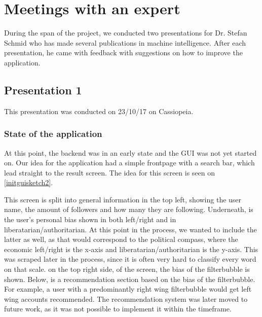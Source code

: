 \section{Meetings with an expert} \label{expMeeting}
During the span of the project, we conducted two presentations for Dr. Stefan
Schmid who has made several publications in machine intelligence. After
each presentation, he came with feedback with suggestions on how to improve the
application. 
\subsection{Presentation 1}
This presentation was conducted on 23/10/17 on Cassiopeia.
\subsubsection{State of the application}
At this point, the backend was in an early state and the \ac{GUI} was not yet
started on. Our idea for the application had a simple frontpage with a search
bar, which lead straight to the result screen. The idea for this screen is seen
on \autoref{initguisketch2}.


This screen is split into general information in the top left, showing the user
name, the amount of followers and how many they are following. Underneath, is
the user's personal bias shown in both left/right and in
liberatarian/authoritarian. At this point in the process, we wanted to include
the latter as well, as that would correspond to the political compass, where the
economic left/right is the x-axis and liberatarian/authoritarian is the y-axis.
This was scraped later in the process, since it is often very hard to classify
every word on that scale. on the top right side, of the screen, the bias of the
filterbubble is shown. Below, is a recommendation section based on the bias of
the filterbubble. For example, a user with a predominantly right wing
filterbubble would get left wing accounts recommended. The recommendation system
was later moved to future work, as it was not possible to implement it within
the timeframe. 

